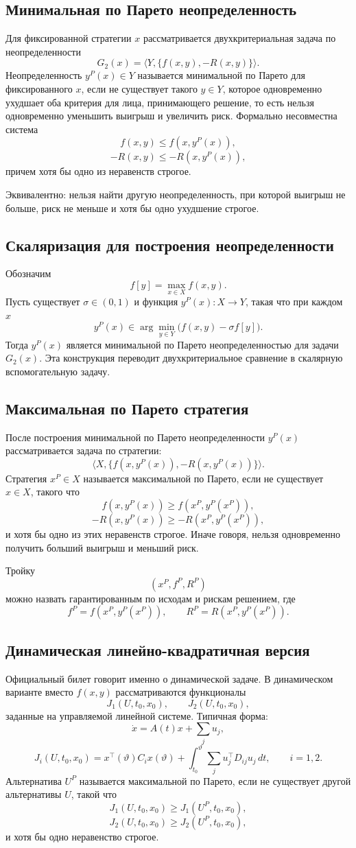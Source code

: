 \documentclass[12pt,a4paper]{article}
\begin{document}
\subsection*{Минимальная по Парето неопределенность}
Для фиксированной стратегии \(x\) рассматривается двухкритериальная задача по неопределенности
\[
G_2(x)=\langle Y,\{f(x,y),-R(x,y)\}\rangle.
\]
Неопределенность \(y^P(x)\in Y\) называется минимальной по Парето для фиксированного \(x\), если не существует такого \(y\in Y\), которое одновременно ухудшает оба критерия для лица, принимающего решение, то есть нельзя одновременно уменьшить выигрыш и увеличить риск. Формально несовместна система
\[
f(x,y)\le f(x,y^P(x)),
\]
\[
-R(x,y)\le -R(x,y^P(x)),
\]
причем хотя бы одно из неравенств строгое.

Эквивалентно: нельзя найти другую неопределенность, при которой выигрыш не больше, риск не меньше и хотя бы одно ухудшение строгое.

\subsection*{Скаляризация для построения неопределенности}
Обозначим
\[
f[y]=\max_{x\in X}f(x,y).
\]
Пусть существует \(\sigma\in(0,1)\) и функция \(y^P(x):X\to Y\), такая что при каждом \(x\)
\[
y^P(x)\in \arg\min_{y\in Y}\bigl(f(x,y)-\sigma f[y]\bigr).
\]
Тогда \(y^P(x)\) является минимальной по Парето неопределенностью для задачи \(G_2(x)\). Эта конструкция переводит двухкритериальное сравнение в скалярную вспомогательную задачу.

\subsection*{Максимальная по Парето стратегия}
После построения минимальной по Парето неопределенности \(y^P(x)\) рассматривается задача по стратегии:
\[
\langle X,\{f(x,y^P(x)),-R(x,y^P(x))\}\rangle.
\]
Стратегия \(x^P\in X\) называется максимальной по Парето, если не существует \(x\in X\), такого что
\[
f(x,y^P(x))\ge f(x^P,y^P(x^P)),
\]
\[
-R(x,y^P(x))\ge -R(x^P,y^P(x^P)),
\]
и хотя бы одно из этих неравенств строгое. Иначе говоря, нельзя одновременно получить больший выигрыш и меньший риск.

Тройку
\[
(x^P,f^P,R^P)
\]
можно назвать гарантированным по исходам и рискам решением, где
\[
f^P=f(x^P,y^P(x^P)),
\qquad
R^P=R(x^P,y^P(x^P)).
\]

\subsection*{Динамическая линейно-квадратичная версия}
Официальный билет говорит именно о динамической задаче. В динамическом варианте вместо \(f(x,y)\) рассматриваются функционалы
\[
J_1(U,t_0,x_0),
\qquad
J_2(U,t_0,x_0),
\]
заданные на управляемой линейной системе. Типичная форма:
\[
\dot x=A(t)x+\sum_j u_j,
\]
\[
J_i(U,t_0,x_0)=x^{\top}(\vartheta)C_i x(\vartheta)+
\int_{t_0}^{\vartheta}\sum_j u_j^{\top} D_{ij}u_j\,dt,
\qquad i=1,2.
\]
Альтернатива \(U^P\) называется максимальной по Парето, если не существует другой альтернативы \(U\), такой что
\[
J_1(U,t_0,x_0)\ge J_1(U^P,t_0,x_0),
\]
\[
J_2(U,t_0,x_0)\ge J_2(U^P,t_0,x_0),
\]
и хотя бы одно неравенство строгое.
\end{document}
